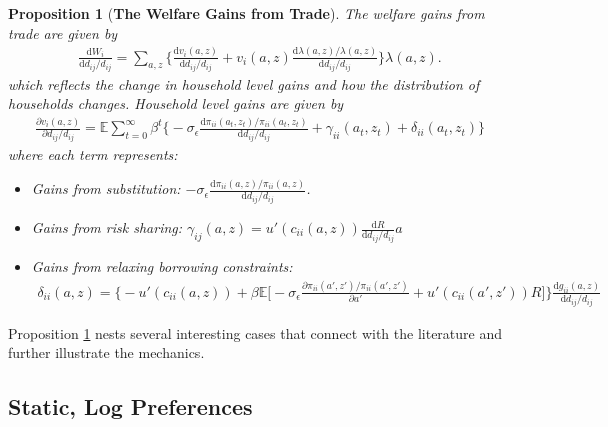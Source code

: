 \documentclass[12pt,pdftex]{article}
\newtheorem{prp}{Proposition}
\begin{document}
\begin{onehalfspacing}
\begin{prp}[\textbf{The Welfare Gains from Trade}] \label{apx-prp:gains-trade} The welfare gains from trade are given by
{\footnotesize
\begin{align}
\frac{\mathrm{d} W_{i}}{\mathrm{d} d_{ij} / d_{ij}} = \sum_{a,z} \bigg \{ \frac{\mathrm{d} v_i(a, z)}{\mathrm{d} d_{ij} / d_{ij}}  + v_{i}(a,z) \frac{\mathrm{d} \lambda(a,z)/ \lambda(a,z)}{\mathrm{d} d_{ij} / d_{ij}}  \bigg \} \lambda(a,z).
\nonumber
\end{align}
}which reflects the change in household level gains and how the distribution of households changes. Household level gains are given by
{\footnotesize
\begin{align}
\nonumber
\frac{\partial v_i(a, z)}{\partial d_{ij} / d_{ij}} = \mathbb{E} \sum_{t = 0}^{\infty} \beta^{t} \bigg \{ -\sigma_{\epsilon} \frac{\mathrm{d} \pi_{ii}(a_{t},z_{t}) / \pi_{ii}(a_{t},z_{t})}{\mathrm{d}d_{ij} / d_{ij}} + \gamma_{ii}(a_{t},z_{t}) + \delta_{ii}(a_{t},z_{t}) \bigg \}
\end{align}
}where each term represents:
\begin{itemize}
\item Gains from substitution: $-\sigma_{\epsilon} \frac{\mathrm{d} \pi_{ii}(a,z) / \pi_{ii}(a,z)}{\mathrm{d}d_{ij} / d_{ij}}$.

\item Gains from risk sharing: $\gamma_{ij}(a,z) = u'(c_{ii}(a,z))\frac{\mathrm{d} R}{\mathrm{d} d_{ij} / d_{ij}}a$

\item Gains from relaxing borrowing constraints:
\begin{align}
\nonumber
\delta_{ii}(a,z) = \bigg \{- u'(c_{ii}(a,z)) + \beta \mathbb{E} \big [-\sigma_{\epsilon} \frac{\partial \pi_{ii}(a',z') / \pi_{ii}(a',z')}{\partial a'} + u'(c_{ii}(a',z'))R \big ] \bigg \}\frac{\mathrm{d} g_{ii}(a,z)}{\mathrm{d} d_{ij} / d_{ij}}
\end{align}
\end{itemize}
\end{prp}
Proposition \ref{apx-prp:gains-trade} nests several interesting cases that connect with the literature and further illustrate the mechanics.

\subsection{Static, Log Preferences}


\end{onehalfspacing}
\end{document}
